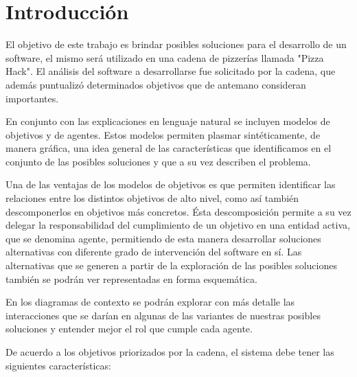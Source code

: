 \documentclass[a4paper,10pt]{article}
\begin{document}
\tableofcontents

\newpage


\section*{Introducci\'on}

El objetivo de este trabajo es brindar posibles soluciones para el desarrollo de un software, el mismo ser\'a utilizado en una cadena de pizzer\'ias llamada "Pizza Hack". El análisis del software a desarrollarse fue solicitado por la cadena, que además puntualizó determinados objetivos que de antemano consideran importantes.


En conjunto con las explicaciones en lenguaje natural se incluyen modelos de objetivos y de agentes. Estos modelos permiten plasmar sintéticamente, de manera gráfica, una idea general de las características que identificamos en el conjunto de las posibles soluciones y que a su vez describen el problema. 

Una de las ventajas de los modelos de objetivos es que permiten identificar las relaciones entre los distintos objetivos de alto nivel, como así también descomponerlos en objetivos más concretos. Ésta descomposición permite a su vez delegar la responsabilidad del cumplimiento de un objetivo en una entidad activa, que se denomina agente, permitiendo de esta manera desarrollar soluciones alternativas con diferente grado de intervención del software en sí. Las alternativas que se generen a partir de la exploración de las posibles soluciones también se podrán ver representadas en forma esquemática. 

En los diagramas de contexto se podrán explorar con más detalle las interacciones que se darían en algunas de las variantes de nuestras posibles soluciones y entender mejor el rol que cumple cada agente.

De acuerdo a los objetivos priorizados por la cadena, el sistema debe tener las siguientes características:
\end{document}
